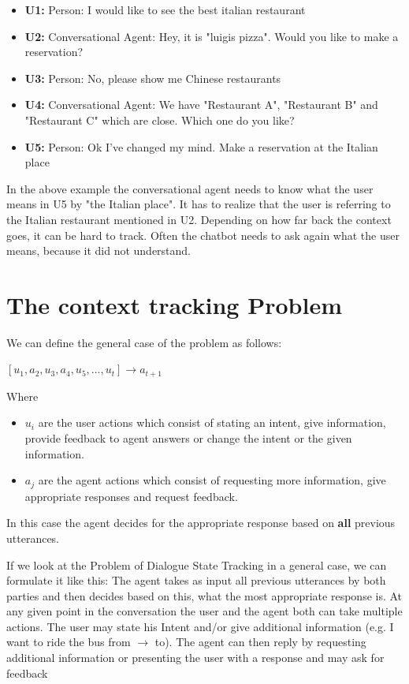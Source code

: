 \documentclass[conference]{IEEEtran}
\begin{document}
\begin{itemize}
\item[]{\textbf{U1:} Person: I would like to see the best italian restaurant}
\item[]{\textbf{U2:} Conversational Agent:  Hey, it is "luigis pizza". Would you like to make a reservation?}
\item[]{\textbf{U3:} Person: No, please show me Chinese restaurants}
\item[]{\textbf{U4:} Conversational Agent: We have "Restaurant A", "Restaurant B" and "Restaurant C" which are close. Which one do you like?}
\item[]{\textbf{U5:} Person: Ok I've changed my mind. Make a reservation at the Italian place}
\end{itemize}
In the above example the conversational agent needs to know what the user means in U5 by "the Italian place". It has to realize that the user is referring to the Italian restaurant mentioned in U2. 
Depending on how far back the context goes, it can be hard to track. Often the chatbot needs to ask again what the user means, because it did not understand.

\section{The context tracking Problem}
We can define the general case of the problem as follows:

$[u_{1},a_{2},u_{3},a_{4},u_{5},...,u_{t}] \rightarrow a_{t+1} $

Where
\begin{itemize}
\item{ $u_{i}$ are the user actions which consist of stating an intent, give information, provide feedback to agent answers or change the intent or the given information.}
\item{$a_{j}$ are the agent actions which consist of requesting more information, give appropriate responses and request feedback.}
\end{itemize}
In this case the agent decides for the appropriate response based on \textbf{all} previous utterances.

If we look at the Problem of Dialogue State Tracking in a general case, we can formulate it like this:
The agent takes as input all previous utterances by both parties and then decides based on this, what the most appropriate response is.
At any given point in the conversation the user and the agent both can take multiple actions. 
The user may state his Intent and/or give additional information (e.g. I want to ride the bus from $\rightarrow$ to). The agent can then reply by requesting additional information or presenting the user with a response and may ask for feedback
\end{document}
